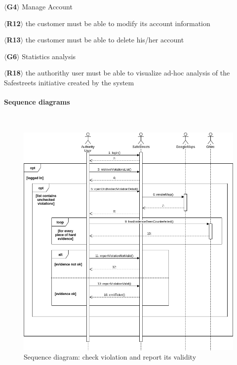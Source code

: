 \documentclass{article}
\begin{document}
$\langle$\textbf{G4}$\rangle$ Manage Account
\begin{description}
    \item $\langle$\textbf{R12}$\rangle$ the customer must be able to modify its
    account information
    \item $\langle$\textbf{R13}$\rangle$ the customer must be able to delete
    his/her account
\end{description}  
$\langle$\textbf{G6}$\rangle$ Statistics analysis
\begin{description}
    \item $\langle$\textbf{R18}$\rangle$ the authorithy user must be able to
    visualize ad-hoc analysis of the Safestreets initiative created by the
    system
\end{description}  
\newpage  
\paragraph{Sequence diagrams}\mbox{}\\
\begin{figure}[H]
    \centering
    \includegraphics[scale=0.47]{Images/SequenceThirdPartyCheckViolation} 
    \caption{Sequence diagram: check violation and report its validity}
\end{figure}
\end{document}
